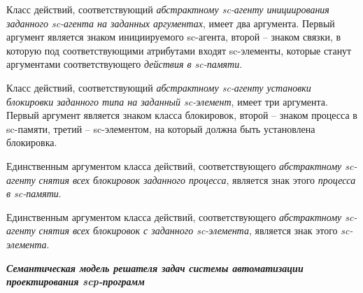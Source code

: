 Класс действий, соответствующий \textit{абстрактному sc-агенту инициирования заданного sc-агента на заданных аргументах}, имеет два аргумента. Первый аргумент является знаком инициируемого sc-агента, второй -- знаком связки, в которую под соответствующими атрибутами входят sc-элементы, которые станут аргументами соответствующего \textit{действия в sc-памяти}.

Класс действий, соответствующий \textit{абстрактному sc-агенту установки блокировки заданного типа на заданный sc-элемент}, имеет три аргумента. Первый аргумент является знаком класса блокировок, второй -- знаком процесса в sc-памяти, третий -- sc-элементом, на который должна быть установлена блокировка.

Единственным аргументом класса действий, соответствующего \textit{абстрактному sc-агенту снятия всех блокировок заданного процесса}, является знак этого \textit{процесса в sc-памяти}.

Единственным аргументом класса действий, соответствующего \textit{абстрактному sc-агенту снятия всех блокировок с заданного sc-элемента}, является знак этого \textit{sc-элемента}.


\textit{\textbf{Семантическая модель решателя задач системы автоматизации проектирования scp-программ}}

